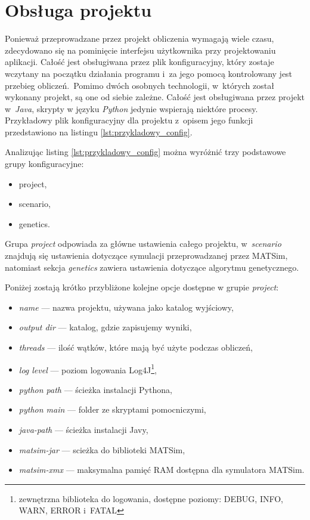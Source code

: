\documentclass[twoside,12pt]{report}
\begin{document}
\section{Obsługa projektu}
Ponieważ przeprowadzane przez projekt obliczenia wymagają wiele czasu, zdecydowano się na pominięcie interfejsu użytkownika przy projektowaniu aplikacji. Całość jest obsługiwana przez plik konfiguracyjny, który zostaje wczytany na początku działania programu i~za jego pomocą kontrolowany jest przebieg obliczeń.~Pomimo dwóch osobnych technologii, w~których został wykonany projekt, są one od siebie zależne. Całość jest obsługiwana przez projekt w~\textit{Java}, skrypty w języku \textit{Python} jedynie wspierają niektóre procesy. Przykładowy plik konfiguracyjny dla projektu z~opisem jego funkcji przedstawiono na listingu \ref{lst:przykladowy_config}.

 

Analizując listing \ref{lst:przykladowy_config} można wyróżnić trzy podstawowe grupy konfiguracyjne:
\begin{itemize}
\item project,
\item scenario,
\item genetics.
\end{itemize}

Grupa \textit{project} odpowiada za główne ustawienia całego projektu, w~\textit{scenario} znajdują się ustawienia dotyczące symulacji przeprowadzanej przez MATSim, natomiast sekcja \textit{genetics} zawiera ustawienia dotyczące algorytmu genetycznego.

Poniżej zostają krótko przybliżone kolejne opcje dostępne w grupie \textit{project}:
\begin{itemize}
\item \textit{name} --- nazwa projektu, używana jako katalog wyjściowy,
\item \textit{output dir} --- katalog, gdzie zapisujemy wyniki,
\item \textit{threads} --- ilość wątków, które mają być użyte podczas obliczeń,
\item \textit{log level} --- poziom logowania Log4J\footnote{zewnętrzna biblioteka do logowania, dostępne poziomy: DEBUG, INFO, WARN, ERROR i~FATAL},
\item \textit{python path} --- ścieżka instalacji Pythona,
\item \textit{python main} --- folder ze skryptami pomocniczymi,
\item \textit{java-path} --- ścieżka instalacji Javy,
\item \textit{matsim-jar} --- scieżka do biblioteki MATSim,
\item \textit{matsim-xmx} --- maksymalna pamięć RAM dostępna dla symulatora MATSim.
\end{itemize}
\end{document}
